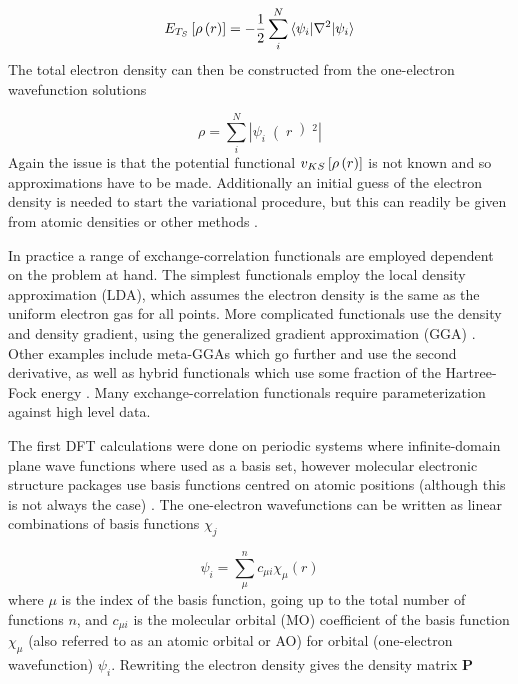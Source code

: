 \begin{equation}
    E_{T_S} \left[ \rho\left(r\right) \right] = -\frac{1}{2} \sum_i^N \braket{\psi_i|\nabla^2|\psi_i}
\end{equation}
%
The total electron density can then be constructed from the one-electron wavefunction
solutions

\begin{equation}
    \rho = \sum_i^N \left\lvert \psi_i \right( r \left)^2 \right\rvert 
\end{equation}
%
Again the issue is that the potential functional $v_{KS} \left[ \rho\left(r\right) \right]$ is
not known and so approximations have to be made. Additionally an initial guess of
the electron density is needed to start the variational procedure, but this can 
readily be given from atomic densities or other methods \cite{Lehtola2019}.

In practice a range of exchange-correlation functionals are employed dependent on
the problem at hand. The simplest functionals employ the local density approximation
(LDA), which assumes the electron density is the same as the uniform electron gas
for all points. More complicated functionals use the density and density gradient,
using the generalized gradient approximation (GGA) \cite{Langreth1983}. Other examples
include meta-GGAs which go further and use the second derivative, as well as hybrid
functionals which use some fraction of the Hartree-Fock energy \cite{Sun2011, Becke1993}. 
Many exchange-correlation functionals require parameterization against high level
data.

The first DFT calculations were done on periodic systems where infinite-domain plane
wave functions where used as a basis set, however molecular electronic structure
packages use basis functions centred on atomic positions (although this is not always
the case) \cite{Boys1950}. The one-electron wavefunctions can be written as linear
combinations of basis functions $\chi_j$

\begin{equation}
    \psi_i = \sum_\mu^n c_{\mu i} \chi_\mu \left( r\right)
\end{equation}
%
where $\mu$ is the index of the basis function, going up to the total number of functions
$n$, and $c_{\mu i}$ is the molecular orbital (MO) coefficient of the basis function
$\chi_\mu$ (also referred to as an atomic orbital or AO) for orbital (one-electron 
wavefunction) $\psi_i$. Rewriting the electron density gives the density matrix 
$\mathbf{P}$

